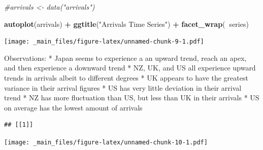 \documentclass[]{book}
\newenvironment{Shaded}{\begin{snugshade}}{\end{snugshade}}
\newcommand{\CommentTok}[1]{\textcolor[rgb]{0.56,0.35,0.01}{\textit{#1}}}
\newcommand{\ControlFlowTok}[1]{\textcolor[rgb]{0.13,0.29,0.53}{\textbf{#1}}}
\newcommand{\KeywordTok}[1]{\textcolor[rgb]{0.13,0.29,0.53}{\textbf{#1}}}
\newcommand{\NormalTok}[1]{#1}
\newcommand{\OperatorTok}[1]{\textcolor[rgb]{0.81,0.36,0.00}{\textbf{#1}}}
\newcommand{\StringTok}[1]{\textcolor[rgb]{0.31,0.60,0.02}{#1}}
\begin{document}
\begin{Shaded}
\begin{Highlighting}[]
\CommentTok{#arrivals <- data("arrivals")}
\end{Highlighting}
\end{Shaded}

\begin{Shaded}
\begin{Highlighting}[]
\KeywordTok{autoplot}\NormalTok{(arrivals) }\OperatorTok{+}
\StringTok{  }\KeywordTok{ggtitle}\NormalTok{(}\StringTok{"Arrivals Time Series"}\NormalTok{) }\OperatorTok{+}
\StringTok{  }\KeywordTok{facet_wrap}\NormalTok{(}\OperatorTok{~}\NormalTok{series)}
\end{Highlighting}
\end{Shaded}

\texttt{[image: \_main\_files/figure-latex/unnamed-chunk-9-1.pdf]}

Observations:
* Japan seems to experience a an upward trend, reach an apex, and then experience a downward trend
* NZ, UK, and US all experience upward trends in arrivals albeit to different degrees
* UK appears to have the greatest variance in their arrival figures
* US has very little deviation in their arrival trend
* NZ has more fluctuation than US, but less than UK in their arrivals
* US on average has the lowest amount of arrivals

\begin{Shaded}
\end{Shaded}

\begin{verbatim}
## [[1]]
\end{verbatim}

\texttt{[image: \_main\_files/figure-latex/unnamed-chunk-10-1.pdf]}
\end{document}
